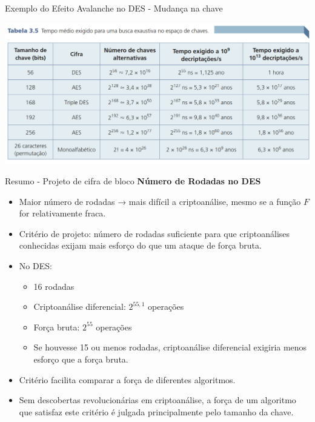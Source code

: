 \begin{frame}{Exemplo do Efeito Avalanche no DES - Mudança na chave}


    \centering
    \includegraphics[width=0.9\linewidth]{Figuras/tempo-para-quebrar.png}

\end{frame}

\begin{frame}{Resumo - Projeto de cifra de bloco}
    \textbf{Número de Rodadas no DES}
    \begin{itemize}
        \item Maior número de rodadas → mais difícil a criptoanálise, mesmo se a função $F$ for relativamente fraca.
        \item Critério de projeto: número de rodadas suficiente para que criptoanálises conhecidas exijam mais esforço do que um ataque de força bruta.
        \item No DES:
              \begin{itemize}
                  \item 16 rodadas
                  \item Criptoanálise diferencial: $2^{55,1}$ operações
                  \item Força bruta: $2^{55}$ operações
                  \item Se houvesse 15 ou menos rodadas, criptoanálise diferencial exigiria menos esforço que a força bruta.
              \end{itemize}
        \item Critério facilita comparar a força de diferentes algoritmos.
        \item Sem descobertas revolucionárias em criptoanálise, a força de um algoritmo que satisfaz este critério é julgada principalmente pelo tamanho da chave.
    \end{itemize}



\end{frame}

